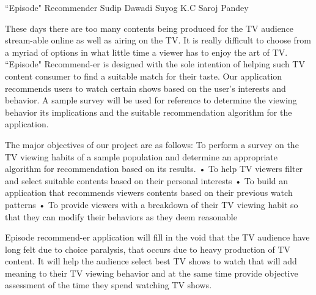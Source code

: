  \begin{conf-abstract}[]
 {``Episode" Recommender}
 {Sudip Dawadi
 	Suyog K.C
 	Saroj Pandey
 }
{}

These days there are too many contents being produced for the TV audience stream-able online as well as airing on the TV. It is really difficult to choose from a myriad of options in what little time a viewer has to enjoy the art of TV. ``Episode" Recommend-er is designed with the sole intention of helping such TV content consumer to find a suitable match for their taste. Our application recommends users to watch certain shows based on the user's interests and behavior. A sample survey will be used for reference to determine the viewing behavior its implications and the suitable recommendation algorithm for the application.

The major objectives of our project are as follows:
To perform a survey on the TV viewing habits of a sample population and determine an appropriate algorithm for recommendation based on its results.
•	To help TV viewers filter and select suitable contents based on their personal interests
•	To build an application that recommends viewers contents based on their previous watch patterns
•	To provide viewers with a breakdown of their TV viewing habit so that they can modify their behaviors as they deem reasonable

Episode recommend-er application will fill in the void that the TV audience have long felt due to choice paralysis, that occurs due to heavy production of TV content. It will help the audience select best TV shows to watch that will add meaning to their TV viewing behavior and at the same time provide objective assessment of the time they spend watching TV shows. 
 \end{conf-abstract}